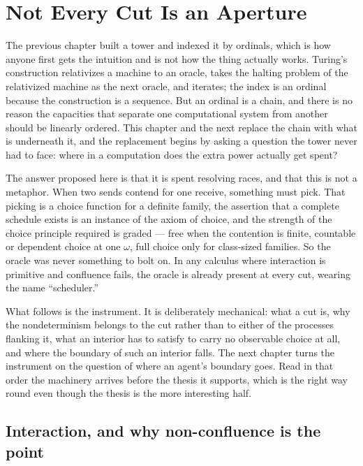 \chapter{Not Every Cut Is an Aperture}
\label{ch:apr}

\noindent
The previous chapter built a tower and indexed it by ordinals, which is how anyone
first gets the intuition and is not how the thing actually works. Turing's
construction relativizes a machine to an oracle, takes the halting problem of the
relativized machine as the next oracle, and iterates; the index is an ordinal because
the construction is a sequence. But an ordinal is a chain, and there is no reason the
capacities that separate one computational system from another should be linearly
ordered. This chapter and the next replace the chain with what is underneath it, and
the replacement begins by asking a question the tower never had to face: where in a
computation does the extra power actually get spent?

The answer proposed here is that it is spent resolving races, and that this is not a
metaphor. When two sends contend for one receive, something must pick. That picking is
a choice function for a definite family, the assertion that a complete schedule exists
is an instance of the axiom of choice, and the strength of the choice principle
required is graded --- free when the contention is finite, countable or dependent
choice at one $\omega$, full choice only for class-sized families. So the oracle was
never something to bolt on. In any calculus where interaction is primitive and
confluence fails, the oracle is already present at every cut, wearing the name
``scheduler.''

What follows is the instrument. It is deliberately mechanical: what a cut is, why the
nondeterminism belongs to the cut rather than to either of the processes flanking it,
what an interior has to satisfy to carry no observable choice at all, and where the
boundary of such an interior falls. The next chapter turns the instrument on the
question of where an agent's boundary goes. Read in that order the machinery arrives
before the thesis it supports, which is the right way round even though the thesis is
the more interesting half.

\bigskip
\section{Interaction, and why non-confluence is the point}\label{ndo:sec:interaction}

